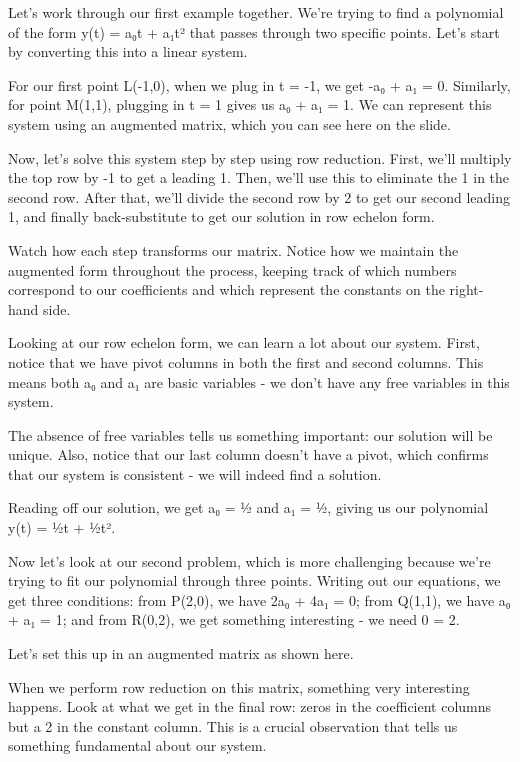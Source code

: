 Let's work through our first example together. We're trying to find a polynomial of the form y(t) = a₀t + a₁t² that passes through two specific points. Let's start by converting this into a linear system.

For our first point L(-1,0), when we plug in t = -1, we get -a₀ + a₁ = 0. Similarly, for point M(1,1), plugging in t = 1 gives us a₀ + a₁ = 1. We can represent this system using an augmented matrix, which you can see here on the slide.

Now, let's solve this system step by step using row reduction. First, we'll multiply the top row by -1 to get a leading 1. Then, we'll use this to eliminate the 1 in the second row. After that, we'll divide the second row by 2 to get our second leading 1, and finally back-substitute to get our solution in row echelon form.

Watch how each step transforms our matrix. Notice how we maintain the augmented form throughout the process, keeping track of which numbers correspond to our coefficients and which represent the constants on the right-hand side.

Looking at our row echelon form, we can learn a lot about our system. First, notice that we have pivot columns in both the first and second columns. This means both a₀ and a₁ are basic variables - we don't have any free variables in this system.

The absence of free variables tells us something important: our solution will be unique. Also, notice that our last column doesn't have a pivot, which confirms that our system is consistent - we will indeed find a solution.

Reading off our solution, we get a₀ = ½ and a₁ = ½, giving us our polynomial y(t) = ½t + ½t².

Now let's look at our second problem, which is more challenging because we're trying to fit our polynomial through three points. Writing out our equations, we get three conditions: from P(2,0), we have 2a₀ + 4a₁ = 0; from Q(1,1), we have a₀ + a₁ = 1; and from R(0,2), we get something interesting - we need 0 = 2.

Let's set this up in an augmented matrix as shown here.

When we perform row reduction on this matrix, something very interesting happens. Look at what we get in the final row: zeros in the coefficient columns but a 2 in the constant column. This is a crucial observation that tells us something fundamental about our system.

